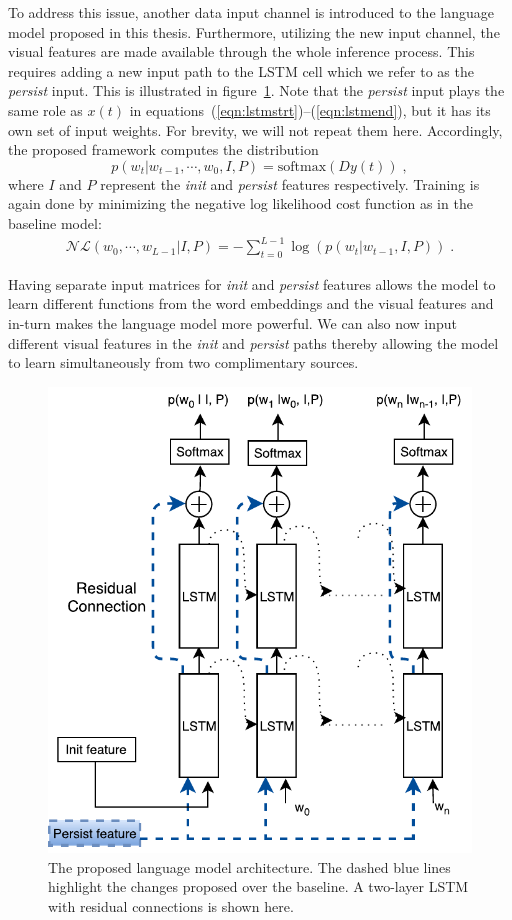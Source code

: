 To address this issue, another data input channel is introduced to the language
model proposed in this thesis.
Furthermore, utilizing the new input channel, the visual features are made
available through the whole inference process.
This requires adding a new input path to the LSTM cell which we refer to as the
\emph{persist} input.
This is illustrated in figure~\ref{fig:proplstmlang}.
Note that the \emph{persist} input plays the same role as $x(t)$ in
equations~(\ref{eqn:lstmstrt})--(\ref{eqn:lstmend}), but it has its own set of
input weights.
For brevity, we will not repeat them here.
Accordingly, the proposed framework computes the distribution
\begin{equation}
p(w_t | w_{t-1},\cdots,w_0, I, P) = \text{softmax}(D y(t)) \;,
\end{equation}
\noindent where $I$ and $P$ represent the \emph{init} and \emph{persist}
features respectively.
Training is again done by minimizing the negative log likelihood cost function
as in the baseline model:
\begin{align}
  \mathcal{NL}(w_0,\cdots, w_{L-1} | I, P) = -\sum_{t=0}^{L-1} \log(p(w_t|w_{t-1},I,P)) \; .
\end{align}

Having separate input matrices for \emph{init} and \emph{persist} features
allows the model to learn different functions from the word embeddings and the
visual features and in-turn makes the language model more powerful.
We can also now input different visual features in the \emph{init} and
\emph{persist} paths thereby allowing the model to learn simultaneously from two
complimentary sources.

\begin{figure}[t]
\begin{center}
  \includegraphics[width=0.7\linewidth]{images/MultilayerResidualLSTM.pdf}
\end{center}
\vspace*{-4mm}
\caption{The proposed language model architecture. The dashed blue lines
        highlight the changes proposed over the baseline. A two-layer LSTM with
residual connections is shown here.}
\label{fig:proplstmlang}
\end{figure}

